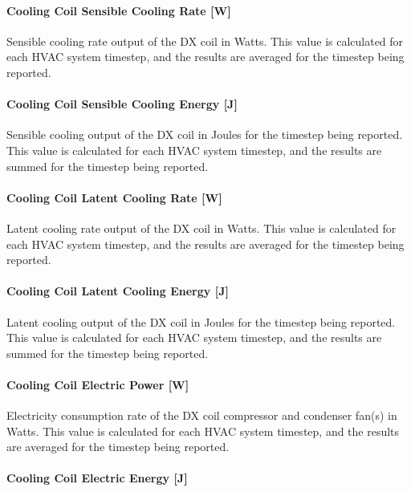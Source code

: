\paragraph{Cooling Coil Sensible Cooling Rate {[}W{]}}

Sensible cooling rate output of the DX coil in Watts. This value is calculated for each HVAC system timestep, and the results are averaged for the timestep being reported.

\paragraph{Cooling Coil Sensible Cooling Energy {[}J{]}}

Sensible cooling output of the DX coil in Joules for the timestep being reported. This value is calculated for each HVAC system timestep, and the results are summed for the timestep being reported.

\paragraph{Cooling Coil Latent Cooling Rate {[}W{]}}

Latent cooling rate output of the DX coil in Watts. This value is calculated for each HVAC system timestep, and the results are averaged for the timestep being reported.

\paragraph{Cooling Coil Latent Cooling Energy {[}J{]}}

Latent cooling output of the DX coil in Joules for the timestep being reported. This value is calculated for each HVAC system timestep, and the results are summed for the timestep being reported.

\paragraph{Cooling Coil Electric Power {[}W{]}}

Electricity consumption rate of the DX coil compressor and condenser fan(s) in Watts. This value is calculated for each HVAC system timestep, and the results are averaged for the timestep being reported.

\paragraph{Cooling Coil Electric Energy {[}J{]}}

